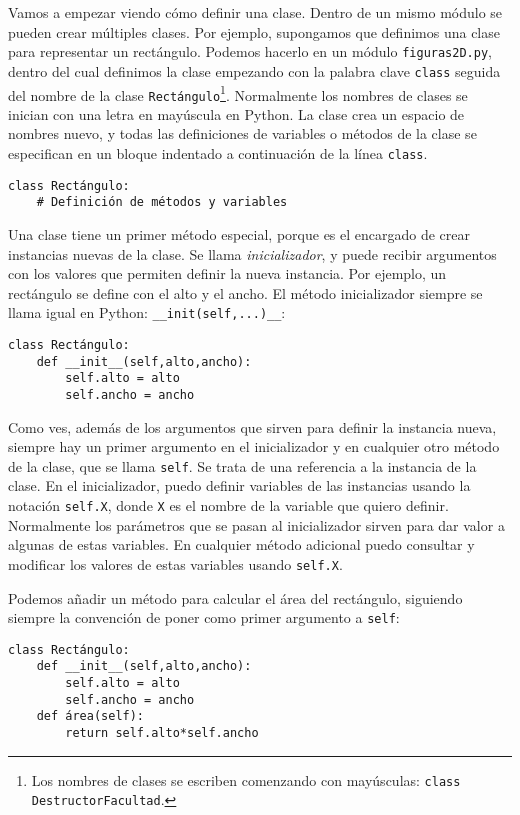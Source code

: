 Vamos a empezar viendo cómo definir una clase. Dentro de un mismo módulo se pueden crear múltiples clases. Por ejemplo, supongamos que definimos una clase para representar un rectángulo. Podemos hacerlo en un módulo \texttt{figuras2D.py}, dentro del cual definimos la clase empezando con la palabra clave \texttt{class} seguida del nombre de la clase \texttt{Rectángulo}\footnote{Los nombres de clases se escriben comenzando con mayúsculas: \texttt{class DestructorFacultad}. }. Normalmente los nombres de clases se inician con una letra en mayúscula en Python. La clase crea un espacio de nombres nuevo, y todas las definiciones de variables o métodos de la clase se especifican en un bloque indentado a continuación de la línea \texttt{class}. 

\begin{lstlisting}
class Rectángulo:
    # Definición de métodos y variables
\end{lstlisting}

Una clase tiene un primer método especial, porque es el encargado de crear instancias nuevas de la clase. Se llama \emph{inicializador}, y puede recibir argumentos con los valores que permiten definir la nueva instancia. Por ejemplo, un rectángulo se define con el alto y el ancho. El método inicializador siempre se llama igual en Python: \texttt{\_\_init(self,...)\_\_}:

\begin{lstlisting}
class Rectángulo:
    def __init__(self,alto,ancho):
        self.alto = alto
        self.ancho = ancho
\end{lstlisting}

Como ves, además de los argumentos que sirven para definir la instancia nueva, siempre hay un primer argumento en el inicializador y en cualquier otro método de la clase, que se llama \texttt{self}. Se trata de una referencia a la instancia de la clase. En el inicializador, puedo definir variables de las instancias usando la notación \texttt{self.X}, donde \texttt{X} es el nombre de la variable que quiero definir. Normalmente los parámetros que se pasan al inicializador sirven para dar valor a algunas de estas variables. En cualquier método adicional puedo consultar y modificar los valores de estas variables usando \texttt{self.X}.

Podemos añadir un método para calcular el área del rectángulo, siguiendo siempre la convención de poner como primer argumento a \texttt{self}:

\begin{lstlisting}
class Rectángulo:
    def __init__(self,alto,ancho):
        self.alto = alto
        self.ancho = ancho
    def área(self):
        return self.alto*self.ancho
\end{lstlisting}

